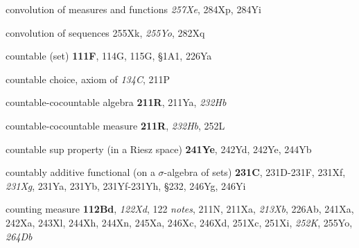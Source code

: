 convolution of measures and functions {\it 257Xe}, 284Xp, 284Yi


convolution of sequences 255Xk, {\it 255Yo}, 282Xq








countable (set) {\bf 111F}, 114G, 115G, \S1A1,
  226Ya







countable choice, axiom of {\it 134C}, 211P






countable-cocountable algebra {\bf 211R}, 211Ya, {\it 232Hb}


countable-cocountable measure {\bf 211R}, {\it 232Hb}, 252L






countable sup property (in a Riesz space) {\bf 241Ye}, 242Yd,
242Ye, 244Yb




countably additive functional (on a $\sigma$-algebra of sets)
{\bf 231C}, 231D-231F, 
231Xf, {\it 231Xg}, 231Ya, 231Yb, 231Yf-231Yh, 
\S232, 246Yg, 246Yi





































counting measure {\bf 112Bd}, {\it 122Xd}, 122 {\it notes},
  211N, 211Xa, {\it 213Xb}, 226Ab, 241Xa, 242Xa, 243Xl, 244Xh,
244Xn, 245Xa, 246Xc, 246Xd, 251Xc, 251Xi, {\it 252K}, 255Yo, {\it 264Db}
  










